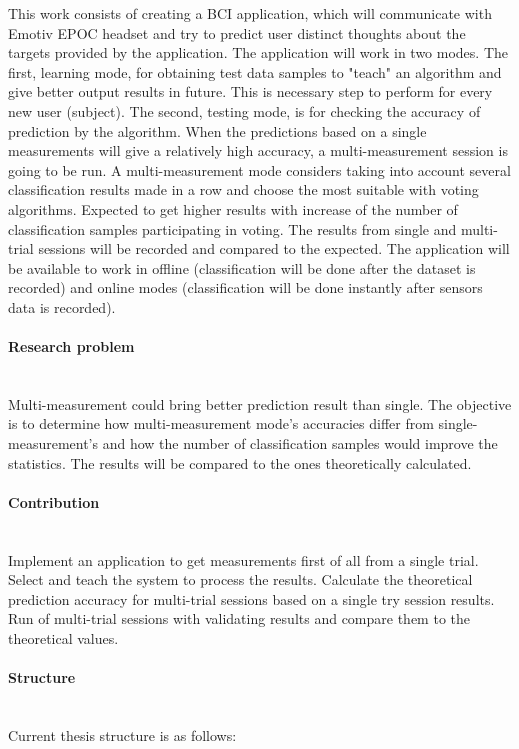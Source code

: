 \documentclass[12pt]{article}
\begin{document}
This work consists of creating a BCI application, which will communicate with Emotiv EPOC headset and try to predict user distinct thoughts about the targets provided by the application. The application will work in two modes. The first, learning mode, for obtaining test data samples to "teach" an algorithm and give better output results in future. This is necessary step to perform for every new user (subject). The second, testing mode, is for checking the accuracy of prediction by the algorithm. When the predictions based on a single measurements will give a relatively high accuracy, a multi-measurement session is going to be run. A multi-measurement mode considers taking into account several classification results made in a row and choose the most suitable with voting algorithms. Expected to get higher results with increase of the number of classification samples participating in voting. The results from single and multi-trial sessions will be recorded and compared to the expected. The application will be available to work in offline (classification will be done after the dataset is recorded) and online modes (classification will be done instantly after sensors data is recorded).
\paragraph{Research problem}~\\

Multi-measurement could bring better prediction result than single. The objective is to determine how multi-measurement mode's accuracies differ from single-measurement's and how the number of classification samples would improve the statistics. The results will be compared to the ones theoretically calculated.
\paragraph{Contribution}~\\

Implement an application to get measurements first of all from a single trial. Select and teach the system to process the results. Calculate the theoretical prediction accuracy for multi-trial sessions based on a single try session results. Run of multi-trial sessions with validating results and compare them to the theoretical values.
\paragraph{Structure}~\\
Current thesis structure is as follows:
\end{document}
